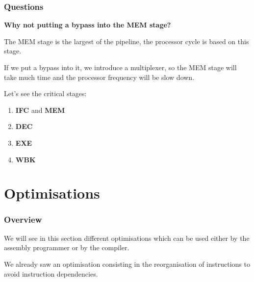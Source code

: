\begin{frame}
  \frametitle{Questions}

  \textbf{Why not putting a bypass into the MEM stage?}

  \nl

  The MEM stage is the largest of the pipeline, the processor cycle
  is based on this stage.

  \nl

  If we put a bypass into it, we introduce a multiplexer, so the MEM
  stage will take much time and the processor frequency will be slow down.

  \nl

  Let's see the critical stages:

  \begin{enumerate}
    \item
      \textbf{IFC} and \textbf{MEM}
    \item
      \textbf{DEC}
    \item
      \textbf{EXE}
    \item
      \textbf{WBK}
  \end{enumerate}
\end{frame}

%
%

\section{Optimisations}


\begin{frame}
  \frametitle{Overview}

  We will see in this section different optimisations which can be
  used either by the assembly programmer or by the compiler.

  \nl

  We already saw an optimisation consisting in the reorganisation
  of instructions to avoid instruction dependencies.
\end{frame}


